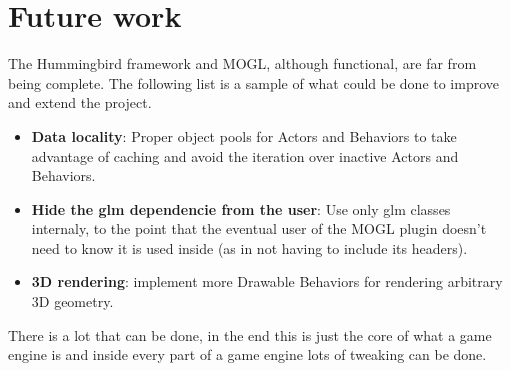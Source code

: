 \chapter{Future work}\label{ch:future_work}

The Hummingbird framework and MOGL, although functional, are far from being complete. 
The following list is a sample of what could be done to improve and extend the project.

\begin{itemize}
\item \textbf{Data locality}: Proper object pools for Actors and Behaviors to take advantage of caching
and avoid the iteration over inactive Actors and Behaviors.
\item \textbf{Hide the glm dependencie from the user}: Use only glm classes internaly, to the point that 
the eventual user of the MOGL plugin doesn't need to know it is used inside (as in not having to include its headers).
\item \textbf{3D rendering}: implement more Drawable Behaviors for rendering arbitrary 3D geometry.
\end{itemize}

There is a lot that can be done, in the end this is just the core of what a game 
engine is and inside every part of a game engine lots of tweaking can be done.
